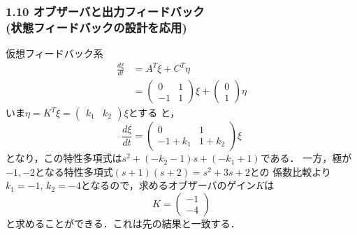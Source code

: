 \documentclass[10pt]{beamer}
\begin{document}
\begin{frame}[t]
\frametitle{1.10 オブザーバと出力フィードバック \\
(状態フィードバックの設計を応用)}
仮想フィードバック系
\begin{align}
 \frac{d\xi}{dt} &= A^T \xi + C^T \eta \nonumber \\
 &=
 \left(
 \begin{array}{cc}
  0 & 1 \\
  -1 & 1
 \end{array}
 \right) \xi +
 \left(
 \begin{array}{c}
  0 \\
  1
 \end{array}
 \right) \eta
\end{align}
いま$\eta = K^T \xi = (\begin{array}{cc}k_1 & k_2\end{array})\xi$とする
と，
\begin{equation}
 \frac{d\xi}{dt} =
 \left(
 \begin{array}{cc}
  0 & 1 \\
  -1+k_1 & 1 + k_2
 \end{array}
 \right) \xi
\end{equation}
となり，この特性多項式は$s^2 + (-k_2 - 1)s + (-k_1 + 1)$である．
一方，極が$-1, -2$となる特性多項式$(s+1)(s+2) = s^2 + 3s + 2$との
係数比較より$k_1 = -1$, $k_2 = -4$となるので，求めるオブザーバのゲイン$K$は
\[
 K =
 \left(
 \begin{array}{c}
  -1 \\
  -4
 \end{array}
 \right)
\]
と求めることができる．これは先の結果と一致する．
\end{frame}
\end{document}
